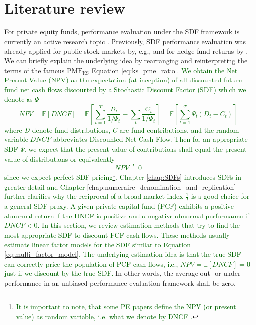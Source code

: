 \section{Literature review}
\label{sec:cfb_sdf_estimators}

For private equity funds, performance evaluation under the SDF framework is currently an active research topic \citep{DLP12,FNP12,B14,B16a,B16b,KN16,ACGP18,GSW19}.
Previously, SDF performance evaluation was already applied for public stock markets by, e.g., \cite{FFJT02} and for hedge fund returns by \cite{LXZ16}.
We can briefly explain the underlying idea by rearranging and reinterpreting the terms of the famous $\mathrm{PME_{KS}}$ Equation \ref{eq:ks_pme_ratio}. 
\textcolor{darkgreen}{
	We obtain the Net Present Value (NPV) as the expectation (at inception) of all discounted future fund net cash flows discounted by a Stochastic Discount Factor (SDF) which we denote as $\Psi$
	\begin{equation}
		\label{eq:net_present_value}
		NPV 
		= 
		\mathbb{E} \left[ DNCF \right]
		= 
		\mathbb{E} \left[
		\sum_{t=1}^T \frac{D_t}{1 / \Psi_t} - \sum_t \frac{C_t}{1 / \Psi_t} 
		\right]
		= 
		\mathbb{E} \left[
		\sum_{t=1}^T \Psi_t \left( D_t - C_t \right)
		\right]
	\end{equation}
	where $D$ denote fund distributions, $C$ are fund contributions, and the random variable $DNCF$ abbreviates Discounted Net Cash Flow.
	Then for an appropriate SDF $\Psi$, we expect that the present value of contributions shall equal the present value of distributions or equivalently
	\begin{equation}
		\label{eq:npv=zero}
		NPV \stackrel{!}{=} 0
	\end{equation}
	since we expect perfect SDF pricing\footnote{\textcolor{darkgreen}{It is important to note, that some PE papers define the NPV (or present value) as random variable, i.e. what we denote by DNCF \cite{L08,DLP12,ACGP18}.}}.
	Chapter \ref{chap:SDFs} introduces SDFs in greater detail and Chapter \ref{chap:numeraire_denomination_and_replication} further clarifies why the reciprocal of a broad market index $\frac{1}{I}$ is a good choice for a general SDF proxy.
	A given private capital fund (PCF) exhibits a positive abnormal return if the DNCF is positive and a negative abnormal performance if $DNCF<0$.
	In this section, we review estimation methods that try to find the most appropriate SDF to discount PCF cash flows.
	These methods usually estimate linear factor models for the SDF similar to Equation \ref{eq:multi_factor_model}.
	The underlying estimation idea is that the true SDF can correctly price the population of PCF cash flows, i.e., $NPV=\mathbb{E} \left[ DNCF \right] = 0$ just if we discount by the true SDF.
}
In other words, the average out- or under-performance in an unbiased performance evaluation framework shall be zero.

